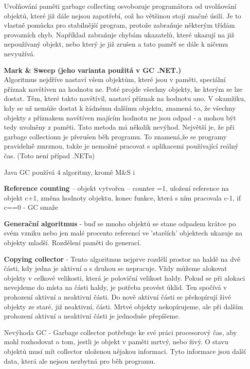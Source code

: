 Uvolňování paměti garbage collecting osvobozuje programátora od uvolňování objektů, které již dále nejsou zapotřebí, což ho většinou stojí značné úsilí. Je to vlastně pomůcka pro stabilnější program, protože zabraňuje některým třídám provozních chyb. Například zabraňuje chybám ukazatelů, které ukazují na již nepoužívaný objekt, nebo který je již zrušen a tato paměť se dále k ničemu nevyužívá.

\textbf{Mark \& Sweep (jeho varianta použitá v GC .NET.)}\\
Algoritmus nejdříve nastaví všem objektům, které jsou v paměti, speciální příznak navštíven na hodnotu ne. Poté projde všechny objekty, ke kterým se lze dostat. Těm, které takto navštívil, nastaví příznak na hodnotu ano. V okamžiku, kdy se už nemůže dostat k žádnému dalšímu objektu, znamená to, že všechny objekty s příznakem navštíven majícím hodnotu ne jsou odpad - a mohou být tedy uvolněny z paměti. Tato metoda má několik nevýhod. Největší je, že při garbage collectionu je přerušen běh programu. To znamená,že se programy pravidelně zmrznou, takže je nemožné pracovat s aplikacemi používající reálný čas. (Toto není případ .NETu)

Java GC používá 4 algoritmy, kromě M\&S i 

\textbf{Reference counting} -- objekt vytvořen -- counter =1, uložení reference na objekt c+1, změna hodnoty objektu, konec funkce, která s ním pracovala c-1, if c==0 - GC smaže

\textbf{Generační algoritmus} - buď se mnoho objektů se stane odpadem krátce po svém vzniku  nebo jen malé procento referencí ve 'starších' objektech ukazuje na objekty mladší. Rozdělení paměti do generací.

\textbf{Copying collector} - Tento algoritmus nejprve rozdělí prostor na haldě na dvě části, kdy jedna je aktivní a s druhou se nepracuje. Vždy můžeme alokovat objekty v celkové velikosti, která je poloviční velikost haldy. Pokud se při alokaci nevejdeme do místa na části haldy, je potřeba provést úklid. Ten spočívá v prohození aktivní a neaktivní části. Do nově aktivní části se překopírují živé objekty ze staré, již neaktivní, části. Mrtvé objekty nekopírujeme, ale při dalším prohození aktivní a neaktivní části je jednoduše přepíšeme.

Nevýhoda GC - Garbage collector potřebuje ke své práci procesorový čas, aby mohl rozhodovat o tom, jestli je objekt v paměti mrtvý, nebo živý. O stavu objektů musí mít collector uloženou nějakou informaci. Tyto informace jsou další data, která ale nejsou nezbytná pro běh programu.

